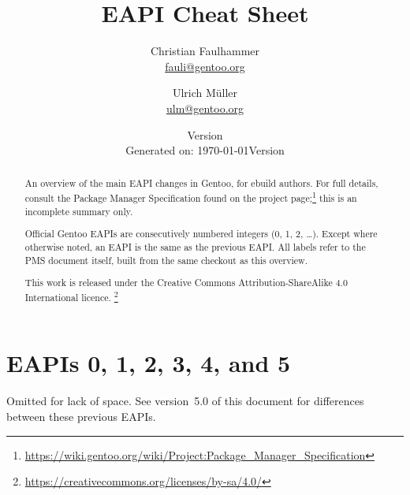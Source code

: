 \documentclass[a4paper,nofoldmark]{leaflet}
\title{EAPI Cheat Sheet}
\author{%
    Christian Faulhammer \\
    \href{mailto:fauli@gentoo.org}{fauli@gentoo.org}
    \and
    Ulrich Müller \\
    \href{mailto:ulm@gentoo.org}{ulm@gentoo.org}
}
\date{Version \version \\ Generated on: \today}
\date{Version \version \\ \printdate{\gitCommitterDate}}
\newcommand{\code}[1]{\texttt{#1}}
\newcommand{\featureref}[1]{\textsc{#1} on page~\pageref{feat:#1}}
\begin{document}
\maketitle
\thispagestyle{empty}
\begin{abstract}
    An overview of the main EAPI changes in Gentoo, for ebuild
    authors.  For full details, consult the Package Manager
    Specification found on the project page;\footnote{%
    \url{https://wiki.gentoo.org/wiki/Project:Package_Manager_Specification}}
    this is an incomplete summary only.

    Official Gentoo EAPIs are consecutively numbered integers (0, 1,
    2, \dots).  Except where otherwise noted, an EAPI is the same as
    the previous EAPI\@.  All labels refer to the PMS document itself,
    built from the same checkout as this overview.


    This work is released under the Creative Commons
    Attribution-ShareAlike 4.0 International licence.%
    \footnote{\url{https://creativecommons.org/licenses/by-sa/4.0/}}
\end{abstract}

\section{EAPIs 0, 1, 2, 3, 4, and 5}
\label{sec:cs:eapi0-2}
Omitted for lack of space. See version~5.0 of this document for
differences between these previous EAPIs.


\end{document}
